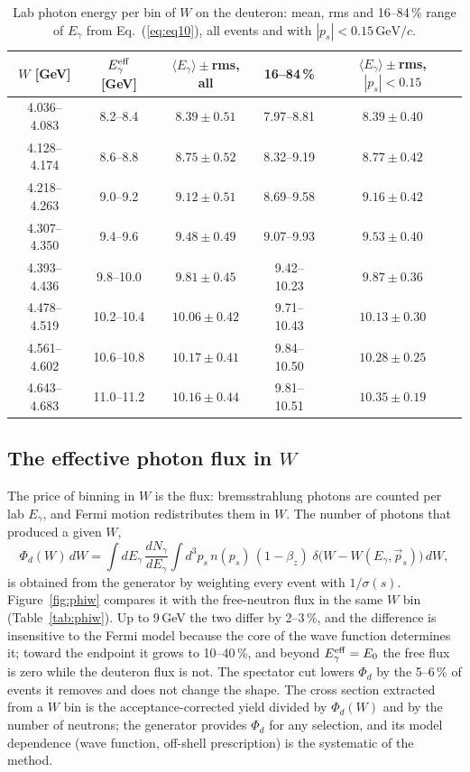 \documentclass[11pt,a4paper]{article}
\newcommand{\Eg}{E_\gamma}
\newcommand{\GeV}{\,\mathrm{GeV}}
\begin{document}
\begin{table}[htbp]
\centering
\caption{Lab photon energy per bin of $W$ on the deuteron: mean, rms and 16--84\,\% range of
$\Eg$ from Eq.~(\ref{eq:eq10}), all events and with $|p_s|<0.15\GeV/c$.}
\label{tab:egperw}
\begin{tabular}{ccccc}
\toprule
$W$ [GeV] & $\Eg^{\rm eff}$ [GeV] & $\langle\Eg\rangle\pm$rms, all & 16--84\,\% & $\langle\Eg\rangle\pm$rms, $|p_s|<0.15$ \\
\midrule
4.036--4.083 & 8.2--8.4   & $8.39\pm0.51$  & 7.97--8.81  & $8.39\pm0.40$ \\
4.128--4.174 & 8.6--8.8   & $8.75\pm0.52$  & 8.32--9.19  & $8.77\pm0.42$ \\
4.218--4.263 & 9.0--9.2   & $9.12\pm0.51$  & 8.69--9.58  & $9.16\pm0.42$ \\
4.307--4.350 & 9.4--9.6   & $9.48\pm0.49$  & 9.07--9.93  & $9.53\pm0.40$ \\
4.393--4.436 & 9.8--10.0  & $9.81\pm0.45$  & 9.42--10.23 & $9.87\pm0.36$ \\
4.478--4.519 & 10.2--10.4 & $10.06\pm0.42$ & 9.71--10.43 & $10.13\pm0.30$ \\
4.561--4.602 & 10.6--10.8 & $10.17\pm0.41$ & 9.84--10.50 & $10.28\pm0.25$ \\
4.643--4.683 & 11.0--11.2 & $10.16\pm0.44$ & 9.81--10.51 & $10.35\pm0.19$ \\
\bottomrule
\end{tabular}
\end{table}

\subsection{The effective photon flux in $W$}

The price of binning in $W$ is the flux: bremsstrahlung photons are counted per lab $\Eg$, and
Fermi motion redistributes them in $W$.  The number of photons that produced a given $W$,
\begin{equation}
\Phi_d(W)\,dW=\int d\Eg\,\frac{dN_\gamma}{d\Eg}\int d^3p_s\,n(p_s)\,(1-\beta_z)\;
\delta\!\bigl(W-W(\Eg,\vec p_s)\bigr)\,dW,
\end{equation}
is obtained from the generator by weighting every event with $1/\sigma(s)$.  Figure~\ref{fig:phiw}
compares it with the free-neutron flux in the same $W$ bin (Table~\ref{tab:phiw}).  Up to 9\,GeV
the two differ by 2--3\,\%, and the difference is insensitive to the Fermi model because the core
of the wave function determines it; toward the endpoint it grows to 10--40\,\%, and beyond
$\Eg^{\rm eff}=E_0$ the free flux is zero while the deuteron flux is not.  The spectator cut lowers
$\Phi_d$ by the 5--6\,\% of events it removes and does not change the shape.  The cross section
extracted from a $W$ bin is the acceptance-corrected yield divided by $\Phi_d(W)$ and by the
number of neutrons; the generator provides $\Phi_d$ for any selection, and its model dependence
(wave function, off-shell prescription) is the systematic of the method.
\end{document}
